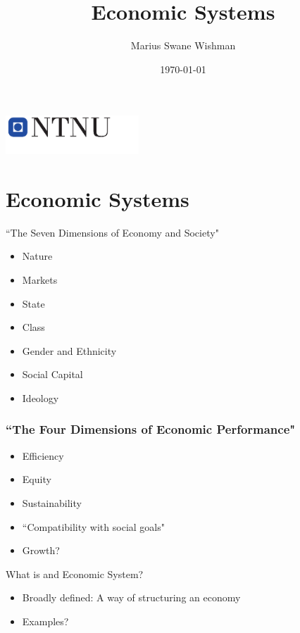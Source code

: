 \documentclass{beamer}
\title[Economic Systems]{Economic Systems}
\subtitle{}
\author[Wishman]{Marius Swane Wishman}
\date{\today}
\institute{ISS}
\begin{document}
\begin{frame}[plain]
\titlepage 
\centering
\includegraphics[width=5cm]{logo_ntnu_u-slagord.pdf} 
\end{frame}

\section{Economic Systems} 

\begin{frame}{``The Seven Dimensions of Economy and Society"}
    \begin{itemize}[<+- | alert@+>]
        \item Nature
        \item Markets
        \item State
        \item Class
        \item Gender and Ethnicity
        \item Social Capital
        \item Ideology
    \end{itemize}{}
\end{frame}{}

\begin{frame}
\frametitle{``The Four Dimensions of Economic Performance"}

\begin{itemize}[<+- | alert@+>]
	\item Efficiency
	\item Equity
	\item Sustainability
	\item ``Compatibility with social goals"
	\item Growth?
\end{itemize}

\end{frame}
\begin{frame}{What is and Economic System?}
    \begin{itemize}[<+- | alert@+>]
        \item Broadly defined: A way of structuring an economy 
        \item Examples?
    \end{itemize}{}
\end{frame}{}
\end{document}

